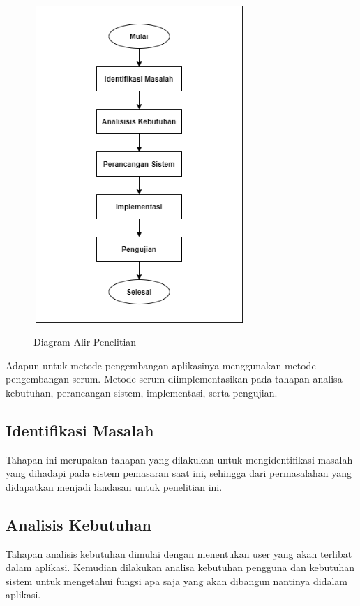 \begin{figure}[H]
\centering
{\includegraphics [width = 8cm, height= 12cm]{gambar/flowchart_proposal}}
\caption{Diagram Alir Penelitian}
\label{alur_penelitian}
\end{figure}

\par Adapun untuk metode pengembangan aplikasinya menggunakan metode pengembangan scrum. Metode scrum diimplementasikan pada tahapan analisa kebutuhan, perancangan sistem, implementasi, serta pengujian.

\fancyhf{} 
\fancyfoot[R]{\thepage}

\subsection{Identifikasi Masalah}
Tahapan ini merupakan tahapan yang dilakukan untuk mengidentifikasi masalah yang dihadapi pada sistem pemasaran saat ini, sehingga dari permasalahan yang didapatkan menjadi landasan untuk penelitian ini.

\subsection{Analisis Kebutuhan}
Tahapan analisis kebutuhan dimulai dengan menentukan user yang akan terlibat dalam aplikasi. Kemudian dilakukan analisa kebutuhan pengguna dan kebutuhan sistem untuk mengetahui fungsi apa saja yang akan dibangun nantinya didalam aplikasi.

